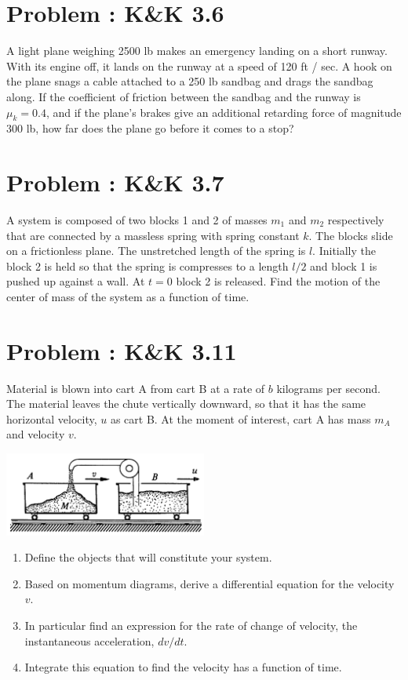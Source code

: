 \documentclass[problems]{esg8012pset}
\begin{document}
\section{Problem \thesection: K\&K 3.6}
  A light plane weighing 2500 lb makes an emergency landing on a short runway. With its engine off, it lands on the runway at a speed of 120 ft / sec. A hook on the plane snags a cable attached to a 250 lb sandbag and drags the sandbag along. If the coefficient of friction between the sandbag and the runway is $\mu_k = 0.4$, and if the plane's brakes give an additional retarding force of magnitude 300 lb, how far does the plane go before it comes to a stop?
\section{Problem \thesection: K\&K 3.7}
  A system is composed of two blocks 1 and 2 of masses $m_1$ and $m_2$ respectively that are connected by a massless spring with spring constant $k$. The blocks slide on a frictionless plane. The unstretched length of the spring is $l$. Initially the block 2 is held so that the spring is compresses to a length $l / 2$ and block 1 is pushed up against a wall. At $t = 0$ block 2 is released. Find the motion of the center of mass of the system as a function of time.
\section{Problem \thesection: K\&K 3.11}
  Material is blown into cart A from cart B at a rate of $b$ kilograms per second. The material leaves the chute vertically downward, so that it has the same horizontal velocity, $u$ as cart B. At the moment of interest, cart A has mass $m_A$ and velocity $v$.
  \begin{center}\includegraphics[width=0.5\textwidth]{ps_04_2}\end{center}
  \begin{enumerate}
    \item Define the objects that will constitute your system.
    \item Based on momentum diagrams, derive a differential equation for the velocity $v$.
    \item In particular find an expression for the rate of change of velocity, the instantaneous acceleration, $d v / d t$.
    \item Integrate this equation to find the velocity has a function of time.
  \end{enumerate}
\end{document}
